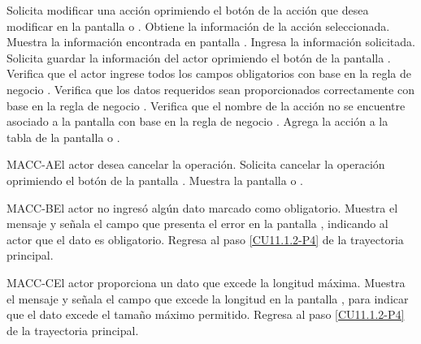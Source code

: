 \begin{UCtrayectoria}
	\UCpaso[\UCactor] Solicita modificar una acción oprimiendo el botón \editar de la acción que desea modificar en la pantalla  o .
	\UCpaso[\UCsist] Obtiene la información de la acción seleccionada.
	\UCpaso[\UCsist] Muestra la información encontrada en pantalla .
	\UCpaso[\UCactor] Ingresa la información solicitada. \label{CU11.1.2-P4}
	\UCpaso[\UCactor] Solicita guardar la información del actor oprimiendo el botón  de la pantalla .  
	\UCpaso[\UCsist] Verifica que el actor ingrese todos los campos obligatorios con base en la regla de negocio . 
	\UCpaso[\UCsist] Verifica que los datos requeridos sean proporcionados correctamente con base en la regla de negocio .    
	\UCpaso[\UCsist] Verifica que el nombre de la acción no se encuentre asociado a la pantalla con base en la regla de negocio .  
	\UCpaso[\UCsist] Agrega la acción a la tabla de la pantalla  o .
\end{UCtrayectoria}		

\begin{UCtrayectoriaA}{MACC-A}{El actor desea cancelar la operación.}
	\UCpaso[\UCactor] Solicita cancelar la operación oprimiendo el botón  de la pantalla .
	\UCpaso[\UCsist] Muestra la pantalla  o .
\end{UCtrayectoriaA}

\begin{UCtrayectoriaA}{MACC-B}{El actor no ingresó algún dato marcado como obligatorio.}
	\UCpaso[\UCsist] Muestra el mensaje  y señala el campo que presenta el error en la pantalla , indicando al actor que el dato es obligatorio.
	\UCpaso Regresa al paso \ref{CU11.1.2-P4} de la trayectoria principal.
\end{UCtrayectoriaA}

\begin{UCtrayectoriaA}{MACC-C}{El actor proporciona un dato que excede la longitud máxima.}
	\UCpaso[\UCsist] Muestra el mensaje  y señala el campo que excede la longitud en la pantalla , para indicar que el dato excede el tamaño máximo permitido.
	\UCpaso Regresa al paso \ref{CU11.1.2-P4} de la trayectoria principal.
\end{UCtrayectoriaA}

